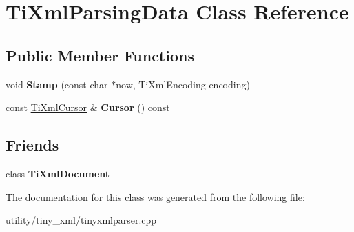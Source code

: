 \hypertarget{class_ti_xml_parsing_data}{}\section{Ti\+Xml\+Parsing\+Data Class Reference}
\label{class_ti_xml_parsing_data}
\subsection*{Public Member Functions}
\begin{DoxyCompactItemize}
\item 
\hypertarget{class_ti_xml_parsing_data_a65cee8ab77a36c605db08c84b4c30a7d}{}\label{class_ti_xml_parsing_data_a65cee8ab77a36c605db08c84b4c30a7d} 
void {\bfseries Stamp} (const char $\ast$now, Ti\+Xml\+Encoding encoding)
\item 
\hypertarget{class_ti_xml_parsing_data_a02ba4903fd3b70b43524ad60a4eece7c}{}\label{class_ti_xml_parsing_data_a02ba4903fd3b70b43524ad60a4eece7c} 
const \hyperlink{struct_ti_xml_cursor}{Ti\+Xml\+Cursor} \& {\bfseries Cursor} () const
\end{DoxyCompactItemize}
\subsection*{Friends}
\begin{DoxyCompactItemize}
\item 
\hypertarget{class_ti_xml_parsing_data_a173617f6dfe902cf484ce5552b950475}{}\label{class_ti_xml_parsing_data_a173617f6dfe902cf484ce5552b950475} 
class {\bfseries Ti\+Xml\+Document}
\end{DoxyCompactItemize}


The documentation for this class was generated from the following file\+:\begin{DoxyCompactItemize}
\item 
utility/tiny\+\_\+xml/tinyxmlparser.\+cpp\end{DoxyCompactItemize}

